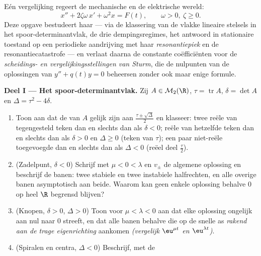\begin{problem}\label{pb:b2:diffeq:1}
Eén vergelijking regeert de mechanische en de elektrische wereld:
\[
x'' + 2\zeta\omega\,x' + \omega^2 x = F(t),
\qquad \omega > 0,\ \zeta \geq 0 .
\]
Deze opgave bestudeert haar  --- via de klassering van de
vlakke lineaire stelsels in het spoor-determinantvlak, de drie
dempingsregimes, het antwoord in stationaire toestand op een
periodieke aandrijving met haar
\emph{resonantiepiek} en de resonantiecatastrofe
--- en verlaat daarna de constante coëfficiënten voor de
\emph{scheidings- en vergelijkingsstellingen van
Sturm}, die de nulpunten van
de oplossingen van $y'' + q(t)y = 0$ beheersen zonder ook maar
enige formule.

\medskip
\noindent\textbf{Deel I --- Het spoor-determinantvlak.} Zij $A \in
\mathcal M_2(\R)$, $\tau = \operatorname{tr}A$, $\delta = \det A$
en $\Delta = \tau^2 - 4\delta$.
\begin{enumerate}
  \item Toon aan dat de  van $A$ gelijk zijn aan
        $\frac{\tau\pm\sqrt\Delta}{2}$ en klasseer: twee reële
         van tegengesteld teken dan en slechts dan als
        $\delta < 0$; reële  van hetzelfde teken dan en
        slechts dan als $\delta > 0$ en $\Delta \geq 0$ (teken van
        $\tau$); een paar niet-reële toegevoegde  dan
        en slechts dan als $\Delta < 0$ (reëel deel $\frac\tau2$).
  \item (Zadelpunt, $\delta < 0$) Schrijf met  $\mu < 0
        < \lambda$ en  $v_\pm$ de algemene oplossing
        en beschrijf de banen: twee stabiele en twee instabiele
        halfrechten, en alle overige banen asymptotisch aan
        beide. Waarom kan geen enkele oplossing behalve $0$ op
        heel $\R$ begrensd blijven?
  \item (Knopen, $\delta > 0$, $\Delta > 0$) Toon voor $\mu <
        \lambda < 0$ aan dat elke oplossing ongelijk aan nul naar
        $0$ streeft, en dat alle banen behalve die op de snelle as
        \emph{rakend aan de trage eigenrichting} aankomen
        \emph{(vergelijk $\eu^{\mu t}$ en $\eu^{\lambda t}$)}.
  \item (Spiralen en centra, $\Delta < 0$) Beschrijf, met de

\end{enumerate}
\end{problem}
